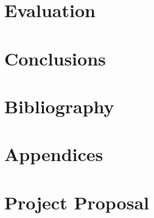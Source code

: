 \documentclass[12pt,twoside,notitlepage]{report}
\begin{document}
\chapter{Evaluation}
\label{chap:evaluation}

\chapter{Conclusions}
\label{chap:conclusions}

\chapter{Bibliography}
\label{chap:bibliography}


\chapter{Appendices}
\label{chap:appendices}

\chapter{Project Proposal}
\label{chap:proposal}

\end{document}
